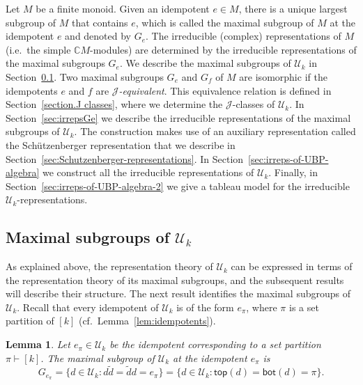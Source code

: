 \documentclass[10pt]{amsart}
\newtheorem{lemma}[theorem]{Lemma}
\theoremstyle{definition}
\theoremstyle{remark}
\newcommand{\CC}{\mathbb C}
\newcommand{\cf}{cf.\ }
\providecommand{\ie}{i.e.\ }
\begin{document}
Let $M$ be a finite monoid.
Given an idempotent $e \in M$, there is a unique largest subgroup of $M$ that
contains $e$, which is called the maximal subgroup of $M$ at the
idempotent $e$ and denoted by $G_e$.
The irreducible (complex) representations of $M$ (\ie the simple
$\CC{M}$-modules) are determined by the irreducible representations of the
maximal subgroups $G_e$. We describe the maximal subgroups of $\mathcal{U}_k$
in Section~\ref{sec:maximalsubgroups}.
Two maximal subgroups $G_e$ and $G_f$ of $M$ are isomorphic if the idempotents
$e$ and $f$ are \emph{$\mathscr{J}$-equivalent}.
This equivalence relation is defined in Section~\ref{section.J classes}, where
we determine the $\mathscr{J}$-classes of $\mathcal{U}_k$.
In Section~\ref{sec:irrepsGe} we describe the irreducible representations
of the maximal subgroups of $\mathcal{U}_k$.
The construction makes use of an auxiliary representation called the
Sch\"utzenberger representation that we describe in
Section~\ref{sec:Schutzenberger-representations}.
In Section~\ref{sec:irreps-of-UBP-algebra} we construct all the
irreducible representations of $\mathcal{U}_k$.
Finally, in Section~\ref{sec:irreps-of-UBP-algebra-2} we give a tableau model
for the irreducible $\mathcal{U}_k$-representations.

\subsection{Maximal subgroups of $\mathcal{U}_k$}
\label{sec:maximalsubgroups}

As explained above,
the representation theory of $\mathcal{U}_k$
can be expressed in terms of the representation theory of
its maximal subgroups, and the subsequent results will describe their structure.
The next result identifies the maximal subgroups of $\mathcal{U}_k$.
Recall that every idempotent of $\mathcal{U}_k$ is of the form
$e_\pi$, where $\pi$ is a set partition of $[k]$ (\cf Lemma~\ref{lem:idempotents}).

\begin{lemma}
    \label{lemma:maximal-subgroups}
    Let $e_\pi \in \mathcal{U}_k$ be the idempotent corresponding to a set partition
    $\pi \vdash [k]$.
    The maximal subgroup of $\mathcal{U}_k$ at the idempotent $e_\pi$ is
    \[
        G_{e_\pi} = \{d \in \mathcal{U}_k: d \widetilde{d} = \widetilde{d} d = e_\pi\}
                  = \{d \in \mathcal{U}_k: \mathsf{top}(d) =\mathsf{bot}(d) = \pi\}.
    \]
\end{lemma}
\end{document}
